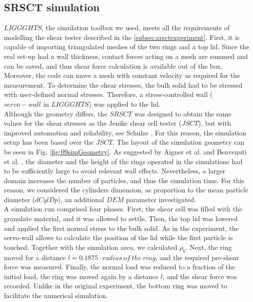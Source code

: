 \begin{appendix}
\subsection{SRSCT simulation}
\label{subsec:srsctsimulation}
$LIGGGHTS$, the simulation toolbox we used, meets all the requirements of
modelling the shear tester described in the \ref{subsec:srsctexperiment}. 
First, it is capable of importing triangulated meshes of the two rings and a top lid. 
Since the real set-up had a wall thickness, contact forces acting on a mesh are summed and can be saved, 
and thus shear force calculation is available out of the box. Moreover, the code can move a mesh with constant 
velocity as required for the measurement. To determine the shear stresses, the bulk solid had to be stressed with 
user-defined normal stresses. Therefore, a stress-controlled wall ($servo-wall$ in $LIGGGHTS$) was applied to the lid. \\
Although the geometry differs, the $SRSCT$ was designed to obtain the same values for the shear stresses as the 
Jenike shear cell tester ($JSCT$), but with improved automation and reliability,
see Schulze \cite{RefWorks:118}. 
For this reason, the simulation setup has been
based over the $JSCT$. The layout of the simulation geometry can be seen in Fig. \ref{fig:09simGeometry}. 
As suggested by Aigner et al. \cite{RefWorks:139} and Benvenuti et al. \cite{RefWorks:173}, 
the diameter and the height of the rings operated in the simulations had to be sufficiently large to avoid relevant wall effects. 
Nevertheless, a larger domain increases the number of particles, and thus the simulation time. 
For this reason, we considered the cylinders dimension, as proportion to the mean particle diameter ($dCylDp$), 
an additional $DEM$ parameter investigated. \\   
%  
A simulation run comprised four phases. 
First, the shear cell was filled with the granulate material, and it was allowed to settle. 
Then, the top lid was lowered and applied the first normal stress to the bulk solid. 
As in the experiment, the servo-wall allows to calculate the position of the lid while the 
first particle is touched. 
Together with the simulation area, we calculated $\rho_b$. 
Next, the ring moved for a distance $l=0.1875 \cdot radius ~of ~the ~ring$, and the required pre-shear force was measured. 
Finally, the normal load was reduced to a fraction of the initial load, 
the ring was moved again by a distance $l$, and the shear force was recorded. 
Unlike in the original experiment, the bottom ring was moved to facilitate the numerical simulation. 

\end{appendix}
